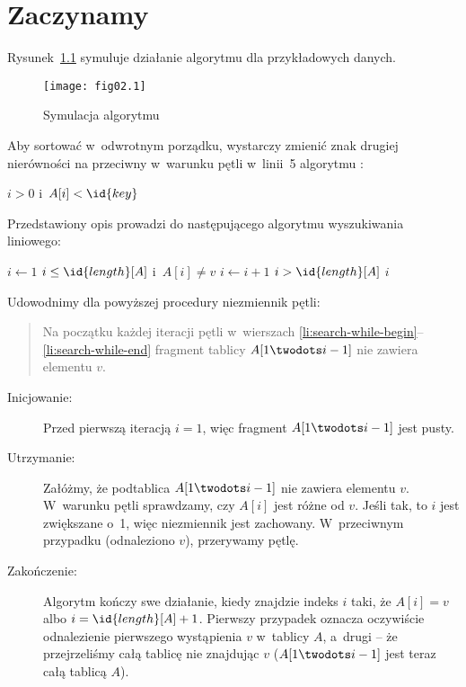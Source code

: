 \chapter{Zaczynamy}


\exercise %
Rysunek~\ref{fig:2.1-1} symuluje działanie algorytmu  dla przykładowych danych.
\begin{figure}[!h]
	\begin{center}
		\texttt{[image: fig02.1]}
	\end{center}
	\caption{Symulacja algorytmu } \label{fig:2.1-1}
\end{figure}

\exercise %
Aby sortować w~odwrotnym porządku, wystarczy zmienić znak drugiej nierówności na przeciwny w~warunku pętli  w~linii~5 algorytmu :
\begin{codebox}
\setcounter{codelinenumber}{4}
\li	\While $i>0$ i~$A[i]<\id{key}$
\end{codebox}

\exercise %
Przedstawiony opis prowadzi do następującego algorytmu wyszukiwania liniowego:
\begin{codebox}
\li	$i\gets1$
\li	\While $i\le\id{length}[A]$ i~$A[i]\ne v$ \label{li:search-while-begin}
\li		\Do $i\gets i+1$
		\End \label{li:search-while-end}
\li	\If $i>\id{length}[A]$
\li		\Then \Return {}
\li		\Else \Return $i$
		\End
\end{codebox}
Udowodnimy dla powyższej procedury niezmiennik pętli:
\begin{quote}
Na początku każdej iteracji pętli  w~wierszach \ref{li:search-while-begin}\nobreakdash--\ref{li:search-while-end} fragment tablicy $A[1\twodots i-1]$ nie zawiera elementu $v$.
\end{quote}
\begin{description}
	\item[Inicjowanie:] Przed pierwszą iteracją $i=1$, więc fragment $A[1\twodots i-1]$ jest pusty.
	\item[Utrzymanie:] Załóżmy, że podtablica $A[1\twodots i-1]$ nie zawiera elementu $v$. W~warunku pętli  sprawdzamy, czy $A[i]$ jest różne od $v$. Jeśli tak, to $i$ jest zwiększane o~1, więc niezmiennik jest zachowany. W~przeciwnym przypadku (odnaleziono $v$), przerywamy pętlę.
	\item[Zakończenie:] Algorytm kończy swe działanie, kiedy znajdzie indeks $i$ taki, że $A[i]=v$ albo $i=\id{length}[A]+1$. Pierwszy przypadek oznacza oczywiście odnalezienie pierwszego wystąpienia $v$ w~tablicy $A$, a~drugi -- że przejrzeliśmy całą tablicę nie znajdując $v$ ($A[1\twodots i-1]$ jest teraz całą tablicą $A$).
\end{description}

